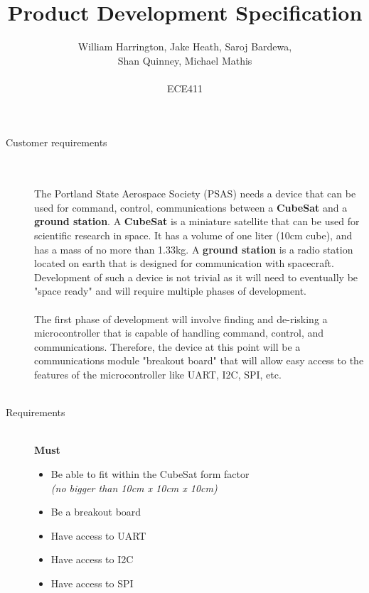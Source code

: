 \documentclass[12pt]{article}
\begin{document}
\title{Product Development Specification}%
\author{William Harrington, Jake Heath, Saroj Bardewa,\\ Shan Quinney, Michael Mathis\\ \\ %
ECE411} %

\maketitle
 \small
\begin{description}
	\item[Customer requirements] \hfill \\ \\
		The Portland State Aerospace Society (PSAS) needs a device that can be used for command, control, communications between a \textbf{CubeSat} and a \textbf{ground station}.
		A \textbf{CubeSat} is a miniature satellite that can be used for scientific research in space. It has a volume of one liter (10cm cube), and has a mass of no more than 1.33kg.
		A \textbf{ground station} is a radio station located on earth that is designed for communication with spacecraft.
		Development of such a device is not trivial as it will need to eventually be "space ready" and will require multiple phases of development. \hfill \\ \\
		The first phase of development will involve finding and de-risking a microcontroller that is capable of handling command, control, and communications.
		Therefore, the device at this point will be a communications module "breakout board" that will allow easy access to the features of the microcontroller like UART, I2C, SPI, etc.
		\hfill \\ \\
		\newpage
	\item[Requirements] \hfill \\
		\textbf{Must}
		\begin{itemize}
			\item{Be able to fit within the CubeSat form factor\\ \textit{(no bigger than 10cm x 10cm x 10cm)}}
			\item{Be a breakout board}
			\item{Have access to UART}
			\item{Have access to I2C}
			\item{Have access to SPI}

\end{itemize}
\end{description}
\end{document}
